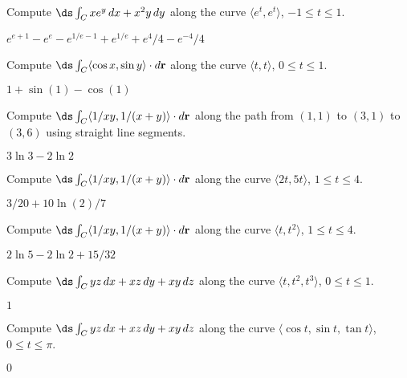 \begin{enumialphparenastyle}
\begin{ex}
Compute $\ds\int_C xe^y\,dx+x^2y\,dy$ along the 
curve $\langle e^t,e^t\rangle$, $-1\le t\le1$.
\begin{sol}
	$e^{e+1}-e^e-e^{1/e-1}+e^{1/e}+e^4/4-e^{-4}/4$
\end{sol}
\end{ex}

\begin{ex}
Compute $\ds\int_C \langle \cos x,\sin y\rangle\cdot 
d{\bf r}$ along the 
curve $\langle t,t\rangle$, $0\le t\le1$.
\begin{sol}
	$1+\sin(1)-\cos(1)$
\end{sol}
\end{ex}

\begin{ex}
Compute $\ds\int_C \langle 1/xy,1/(x+y)\rangle\cdot
d{\bf r}$ along the 
path from $(1,1)$ to $(3,1)$ to $(3,6)$ using straight line segments.
\begin{sol}
	$3\ln3-2\ln2$
\end{sol}
\end{ex}

\begin{ex}
Compute $\ds\int_C \langle 1/xy,1/(x+y)\rangle\cdot
d{\bf r}$ along the 
curve $\langle 2t,5t\rangle$, $1\le t\le 4$.
\begin{sol}
	$3/20+10\ln(2)/7$
\end{sol}
\end{ex}

\begin{ex}
Compute $\ds\int_C \langle 1/xy,1/(x+y)\rangle\cdot 
d{\bf r}$ along the 
curve $\langle t,t^2\rangle$, $1\le t\le 4$.
\begin{sol}
	$2\ln5-2\ln2+15/32$
\end{sol}
\end{ex}

\begin{ex}
Compute $\ds\int_C yz\,dx+xz\,dy+xy\,dz$ along the curve
$\langle t,t^2,t^3\rangle$, $0\le t\le1$.
\begin{sol}
	$1$
\end{sol}
\end{ex}

\begin{ex}
Compute $\ds\int_C yz\,dx+xz\,dy+xy\,dz$ along the curve
$\langle \cos t,\sin t,\tan t\rangle$, $0\le t\le\pi$.
\begin{sol}
	$0$
\end{sol}
\end{ex}


\end{enumialphparenastyle}
